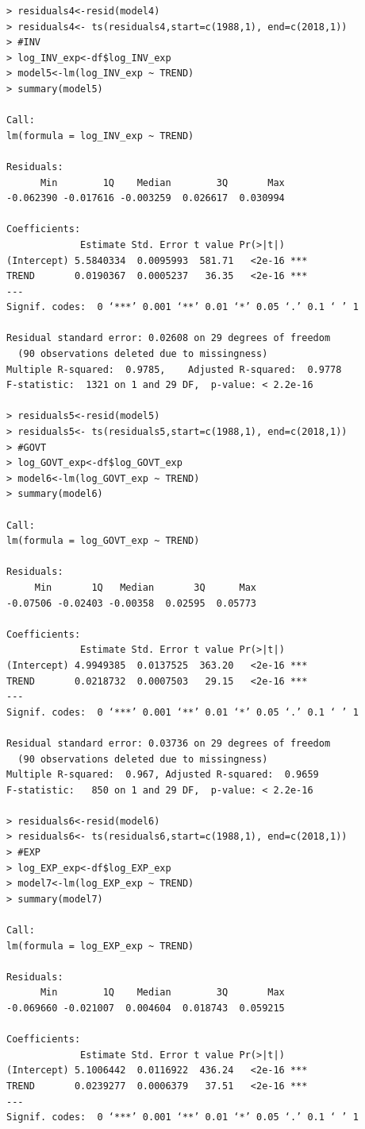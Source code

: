 \documentclass[12pt]{article}
\begin{document}
\begin{verbatim}
> residuals4<-resid(model4)
> residuals4<- ts(residuals4,start=c(1988,1), end=c(2018,1))
> #INV
> log_INV_exp<-df$log_INV_exp
> model5<-lm(log_INV_exp ~ TREND)
> summary(model5)

Call:
lm(formula = log_INV_exp ~ TREND)

Residuals:
      Min        1Q    Median        3Q       Max 
-0.062390 -0.017616 -0.003259  0.026617  0.030994 

Coefficients:
             Estimate Std. Error t value Pr(>|t|)    
(Intercept) 5.5840334  0.0095993  581.71   <2e-16 ***
TREND       0.0190367  0.0005237   36.35   <2e-16 ***
---
Signif. codes:  0 ‘***’ 0.001 ‘**’ 0.01 ‘*’ 0.05 ‘.’ 0.1 ‘ ’ 1

Residual standard error: 0.02608 on 29 degrees of freedom
  (90 observations deleted due to missingness)
Multiple R-squared:  0.9785,	Adjusted R-squared:  0.9778 
F-statistic:  1321 on 1 and 29 DF,  p-value: < 2.2e-16

> residuals5<-resid(model5)
> residuals5<- ts(residuals5,start=c(1988,1), end=c(2018,1))
> #GOVT
> log_GOVT_exp<-df$log_GOVT_exp
> model6<-lm(log_GOVT_exp ~ TREND)
> summary(model6)

Call:
lm(formula = log_GOVT_exp ~ TREND)

Residuals:
     Min       1Q   Median       3Q      Max 
-0.07506 -0.02403 -0.00358  0.02595  0.05773 

Coefficients:
             Estimate Std. Error t value Pr(>|t|)    
(Intercept) 4.9949385  0.0137525  363.20   <2e-16 ***
TREND       0.0218732  0.0007503   29.15   <2e-16 ***
---
Signif. codes:  0 ‘***’ 0.001 ‘**’ 0.01 ‘*’ 0.05 ‘.’ 0.1 ‘ ’ 1

Residual standard error: 0.03736 on 29 degrees of freedom
  (90 observations deleted due to missingness)
Multiple R-squared:  0.967,	Adjusted R-squared:  0.9659 
F-statistic:   850 on 1 and 29 DF,  p-value: < 2.2e-16

> residuals6<-resid(model6)
> residuals6<- ts(residuals6,start=c(1988,1), end=c(2018,1))
> #EXP
> log_EXP_exp<-df$log_EXP_exp
> model7<-lm(log_EXP_exp ~ TREND)
> summary(model7)

Call:
lm(formula = log_EXP_exp ~ TREND)

Residuals:
      Min        1Q    Median        3Q       Max 
-0.069660 -0.021007  0.004604  0.018743  0.059215 

Coefficients:
             Estimate Std. Error t value Pr(>|t|)    
(Intercept) 5.1006442  0.0116922  436.24   <2e-16 ***
TREND       0.0239277  0.0006379   37.51   <2e-16 ***
---
Signif. codes:  0 ‘***’ 0.001 ‘**’ 0.01 ‘*’ 0.05 ‘.’ 0.1 ‘ ’ 1


\end{verbatim}
\end{document}
